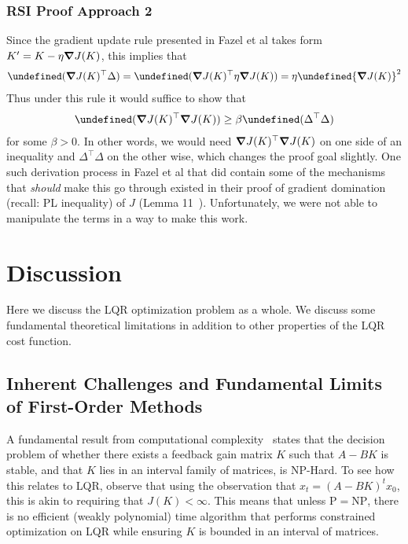 \documentclass[11pt]{article}  %
\let\norm\undefined
\newcommand{\norm}[1]{\lVert #1 \rVert}
\let\Tr\undefined
\DeclareMathOperator{\Tr}{Tr}
\begin{document}
\subsubsection{RSI Proof Approach 2}
Since the gradient update rule presented in Fazel et al takes form
\(K^\prime = K - \eta \grad J(K)\),
this implies that
\begin{align}
  \Tr (\grad J(K) ^\top \Delta)
    = \Tr (\grad J(K)^\top \eta \grad J(K))
    = \eta \norm{\grad J(K)}^2
\end{align}
Thus under this rule it would suffice to show that
\begin{align}
  \Tr(\grad J(K)^\top \grad J(K))
    \geq \beta \Tr (\Delta^\top \Delta)
\end{align}
for some \(\beta > 0\).
In other words, we would need \(\grad J(K)^\top \grad J(K)\)
on one side of an inequality and \(\Delta ^\top \Delta\)
on the other wise, which changes the proof goal slightly.
One such derivation process in Fazel et al that did contain
some of the mechanisms that \textit{should} make this go through
existed in their proof of
gradient domination (recall: PL inequality)
of \(J\) (Lemma 11~\cite{fazel2018global}).
Unfortunately, we were not able to
manipulate the terms in a way to make this work.




\section{Discussion}
\label{sec:discussion}

Here we discuss the LQR optimization problem as a whole.
We discuss some fundamental theoretical limitations
in addition to other properties of the LQR cost function.

\subsection{Inherent Challenges and Fundamental Limits of First-Order Methods}
A fundamental result from computational complexity~\cite{blondel1997np}
states that
the decision problem of whether there exists a feedback gain matrix \(K\)
such that \(A - BK\) is stable,
and that \(K\) lies in an interval family of matrices,
is NP-Hard.
To see how this relates to LQR,
observe that using the observation that \(x_t = (A - BK)^t x_0\),
this is akin to requiring that \(J(K) < \infty\).
This means that unless \(\mathrm{P} = \mathrm{NP}\),
there is no efficient (weakly polynomial) time algorithm that
performs constrained optimization on LQR while ensuring \(K\) is
bounded in an interval of matrices.
\end{document}
